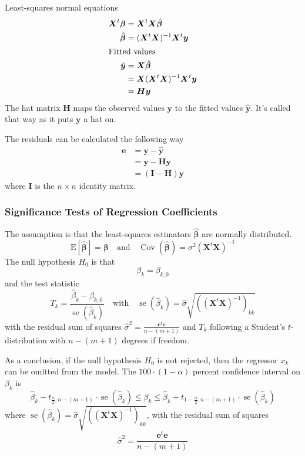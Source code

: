 \documentclass[11pt]{article}
\theoremstyle{definition}
\newcommand*\ev[1]{\mathrel{\text{E}\left[#1\right]}}
\newcommand*\Cov[1]{\mathop{\text{Cov}}\left(#1\right)}
\newcommand*\se[1]{\mathop{\text{se}}\left(#1\right)}
\begin{document}
Least-squares normal equations
\begin{align*}
	\bm{X}^t\bm{\beta} &= \bm{X}^t\bm{X}\hat{\bm{\beta}}\\
	\hat{\bm{\beta}} &= (\bm{X}^t\bm{X})^{-1}\bm{X}^t\bm{y}\\
	\intertext{Fitted values}
	\hat{\bm{y}} &= \bm{X}\hat{\bm{\beta}}\\
	&= \bm{X}(\bm{X}^t\bm{X})^{-1}\bm{X}^t\bm{y}\\
	&= \bm{H}\bm{y}
\end{align*}
The hat matrix $\bm{H}$ maps the observed values $\bm{y}$ to the fitted values $\hat{\bm{y}}$. It's called that way as it puts $\bm{y}$ a hat on.

The residuals can be calculated the following way
\begin{align*}
	\bm{e} &= \bm{y} - \hat{\bm{y}}\\
	&= \bm{y} - \bm{H}\bm{y}\\
	&= (\bm{I} - \bm{H}) \bm{y}
\end{align*}
where $\bm{I}$ is the $n\times n$ identity matrix.

\subsubsection{Significance Tests of Regression Coefficients}
The assumption is that the least-squares estimators $\hat{\bm{\beta}}$ are normally distributed.
\begin{equation*}
	\ev{\hat{\bm{\beta}}} = \bm{\beta}\quad\text{and}\quad\Cov{\hat{\bm{\beta}}} = \sigma^2(\bm{X}^t\bm{X})^{-1}
\end{equation*}
The null hypothesis $H_0$ is that
\begin{equation*}
	\beta_k = \beta_{k,0}
\end{equation*}
and the test statistic
\begin{equation*}
	T_k = \frac{\hat{\beta}_k - \beta_{k,0}}{\se{\hat{\beta}_k}}\quad\text{with}\quad\se{\hat{\beta}_k} = \hat{\sigma}\sqrt{\left((\bm{X}^t\bm{X})^{-1}\right)_{kk}}
\end{equation*}
with the residual sum of squares $\hat{\sigma}^2 = \frac{\bm{e}^t\bm{e}}{n-(m+1)}$ and $T_k$ following a Student's $t$-distribution with $n-(m+1)$ degrees if freedom.

As a conclusion, if the null hypothesis $H_0$ is not rejected, then the regressor $x_k$ can be omitted from the model. The $100\cdot(1-\alpha)$ percent confidence interval on $\beta_k$ is
\begin{equation*}
	\hat{\beta}_k - t_{\frac{\alpha}{2},n-(m+1)}\cdot\se{\hat{\beta}_k} \leq \beta_k \leq \hat{\beta}_k + t_{1 - \frac{\alpha}{2},n-(m+1)}\cdot\se{\hat{\beta}_k}
\end{equation*}
where $\se{\hat{\beta}_k} = \hat{\sigma}\sqrt{\left((\bm{X}^t\bm{X})^{-1}\right)_{kk}}$, with the residual sum of squares
\begin{equation*}
	\hat{\sigma}^2 = \frac{\bm{e}^t\bm{e}}{n-(m+1)}
\end{equation*}
\end{document}
